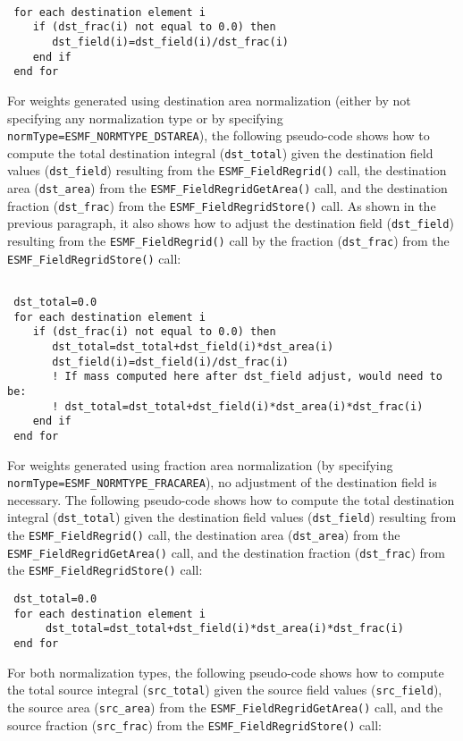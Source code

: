 \begin{verbatim}

 for each destination element i
    if (dst_frac(i) not equal to 0.0) then
       dst_field(i)=dst_field(i)/dst_frac(i)
    end if
 end for
\end{verbatim}

For weights generated using destination area normalization (either by not specifying any normalization type or by specifying {\tt normType=ESMF\_NORMTYPE\_DSTAREA}), 
the following pseudo-code shows how to compute the total destination integral ({\tt dst\_total}) given the
destination field values ({\tt dst\_field}) resulting
from the {\tt ESMF\_FieldRegrid()} call, the destination area ({\tt dst\_area}) from the {\tt ESMF\_FieldRegridGetArea()} call,  and the destination fraction ({\tt dst\_frac}) from the {\tt ESMF\_FieldRegridStore()} call. As shown in the previous paragraph, it also 
shows how to adjust the destination field ({\tt dst\_field}) resulting from the {\tt ESMF\_FieldRegrid()} call by the
fraction ({\tt dst\_frac}) from the {\tt ESMF\_FieldRegridStore()} call: 

\begin{verbatim}

 dst_total=0.0
 for each destination element i
    if (dst_frac(i) not equal to 0.0) then
       dst_total=dst_total+dst_field(i)*dst_area(i) 
       dst_field(i)=dst_field(i)/dst_frac(i)
       ! If mass computed here after dst_field adjust, would need to be:
       ! dst_total=dst_total+dst_field(i)*dst_area(i)*dst_frac(i) 
    end if
 end for
\end{verbatim}

For weights generated using fraction area normalization (by specifying {\tt normType=ESMF\_NORMTYPE\_FRACAREA}),
no adjustment of the destination field is necessary. The following pseudo-code shows how to compute 
the total destination integral ({\tt dst\_total}) given the
destination field values ({\tt dst\_field}) resulting
from the {\tt ESMF\_FieldRegrid()} call, the destination area ({\tt dst\_area}) from the {\tt ESMF\_FieldRegridGetArea()}
call,  and the destination fraction ({\tt dst\_frac}) from the {\tt ESMF\_FieldRegridStore()} call:

\begin{verbatim}
 dst_total=0.0
 for each destination element i
      dst_total=dst_total+dst_field(i)*dst_area(i)*dst_frac(i) 
 end for
\end{verbatim}

 For both normalization types, the following pseudo-code shows how to compute the total source integral ({\tt src\_total}) given the source field values
 ({\tt src\_field}), the source area ({\tt src\_area}) from the {\tt ESMF\_FieldRegridGetArea()} call, and
 the source fraction ({\tt src\_frac}) from the {\tt ESMF\_FieldRegridStore()} call:

